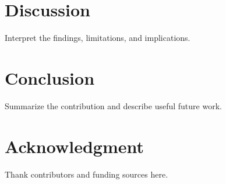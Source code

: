 \documentclass[conference]{IEEEtran}
\begin{document}
\section{Discussion}\label{sec:discussion}
Interpret the findings, limitations, and implications.
\section{Conclusion}\label{sec:conclusion}
Summarize the contribution and describe useful future work.
\section*{Acknowledgment}
Thank contributors and funding sources here.


\end{document}
